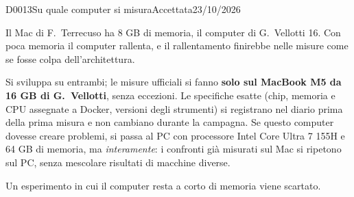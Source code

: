 \begin{decisione}{D0013}{Su quale computer si misura}{Accettata}{23/10/2026}

\contesto
Il Mac di F.~Terrecuso ha 8 GB di memoria, il computer di G.~Vellotti 16. Con poca memoria il computer rallenta, e il rallentamento finirebbe nelle misure come se fosse colpa dell'architettura.

\scelta
Si sviluppa su entrambi; le misure ufficiali si fanno \textbf{solo sul MacBook M5 da 16 GB di G.~Vellotti}, senza eccezioni. Le specifiche esatte (chip, memoria e CPU assegnate a Docker, versioni degli strumenti) si registrano nel diario prima della prima misura e non cambiano durante la campagna. Se questo computer dovesse creare problemi, si passa al PC con processore Intel Core Ultra 7 155H e 64 GB di memoria, ma \emph{interamente}: i confronti già misurati sul Mac si ripetono sul PC, senza mescolare risultati di macchine diverse.

\conseguenze
Un esperimento in cui il computer resta a corto di memoria viene scartato.

\end{decisione}
